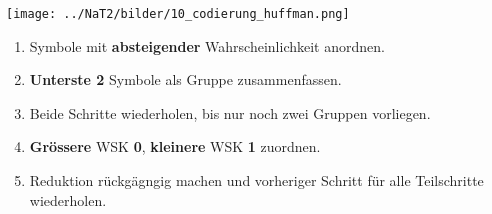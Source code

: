\begin{minipage}{8cm}
	\begin{center}
	\texttt{[image: ../NaT2/bilder/10\_codierung\_huffman.png]}
	\end{center}
\end{minipage}
\begin{minipage}{11cm}
	\begin{enumerate}
	  \item Symbole mit \textbf{absteigender} Wahrscheinlichkeit anordnen.
	  \item \textbf{Unterste 2} Symbole als Gruppe zusammenfassen.
	  \item Beide Schritte wiederholen, bis nur noch zwei Gruppen vorliegen.
	  \item \textbf{Grössere} WSK \textbf{0}, \textbf{kleinere} WSK \textbf{1} zuordnen.
	  \item Reduktion rückgägngig machen und vorheriger Schritt für alle Teilschritte wiederholen.
	\end{enumerate}
\end{minipage}
